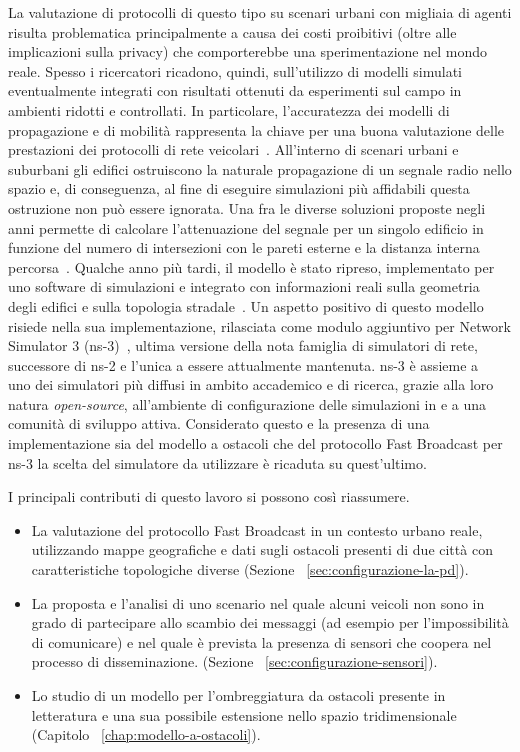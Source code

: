 La valutazione di protocolli di questo tipo su scenari urbani con migliaia di agenti risulta
problematica principalmente a causa dei costi proibitivi (oltre alle implicazioni sulla privacy)
che comporterebbe una sperimentazione nel mondo reale.
Spesso i ricercatori ricadono, quindi, sull'utilizzo di modelli simulati eventualmente integrati con risultati ottenuti
da esperimenti sul campo in ambienti ridotti e controllati.
In particolare, l'accuratezza dei modelli di propagazione e di mobilità rappresenta la chiave per una buona valutazione delle prestazioni
dei protocolli di rete veicolari~\cite{4020783}.
All'interno di scenari urbani e suburbani gli edifici ostruiscono la naturale propagazione di un segnale radio nello spazio
e, di conseguenza, al fine di eseguire simulazioni più affidabili questa ostruzione non può essere ignorata.
Una fra le diverse soluzioni proposte negli anni permette di calcolare l'attenuazione del segnale per un singolo edificio
in funzione del numero di intersezioni con le pareti esterne e la distanza interna percorsa~\cite{5720204}.
Qualche anno più tardi, il modello è stato ripreso, implementato per uno software di simulazioni
e integrato con informazioni reali sulla geometria degli edifici e sulla topologia stradale~\cite{Carpenter:2015:OMI:2756509.2756512}.
Un aspetto positivo di questo modello risiede nella sua implementazione, rilasciata
come modulo aggiuntivo per Network Simulator 3 (ns-3)~\cite{ns3Website},
ultima versione della nota famiglia di simulatori di rete, successore di ns-2
e l'unica a essere attualmente mantenuta.
ns-3 è assieme a \omnet~\cite{omnetWebsite} uno dei simulatori più diffusi
in ambito accademico e di ricerca, grazie alla loro natura \textit{open-source},
all'ambiente di configurazione delle simulazioni in \Cpp{} e a una comunità di sviluppo attiva.
Considerato questo e la presenza di una implementazione sia del modello a ostacoli
che del protocollo Fast Broadcast per ns-3 la scelta del simulatore da utilizzare
è ricaduta su quest'ultimo.

I principali contributi di questo lavoro si possono così riassumere.
\begin{itemize}[noitemsep]
	\item La valutazione del protocollo Fast Broadcast in un contesto urbano reale,
				utilizzando mappe geografiche e dati sugli ostacoli presenti di due città con caratteristiche topologiche diverse (Sezione ~\ref{sec:configurazione-la-pd}).
	\item La proposta e l'analisi di uno scenario nel quale alcuni veicoli non sono in grado di partecipare allo scambio dei messaggi (ad esempio per l'impossibilità di comunicare)
				e nel quale è prevista la presenza di sensori che coopera nel processo di disseminazione. (Sezione ~\ref{sec:configurazione-sensori}).
	\item Lo studio di un modello per l'ombreggiatura da ostacoli presente in letteratura e una sua possibile estensione nello spazio tridimensionale (Capitolo ~\ref{chap:modello-a-ostacoli}).
\end{itemize}
%
